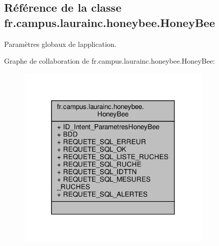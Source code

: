 \hypertarget{classfr_1_1campus_1_1laurainc_1_1honeybee_1_1_honey_bee}{}\subsection{Référence de la classe fr.\+campus.\+laurainc.\+honeybee.\+Honey\+Bee}
\label{classfr_1_1campus_1_1laurainc_1_1honeybee_1_1_honey_bee}


Paramètres globaux de l\textquotesingle{}application.  




Graphe de collaboration de fr.\+campus.\+laurainc.\+honeybee.\+Honey\+Bee\+:\nopagebreak
\begin{figure}[H]
\begin{center}
\leavevmode
\includegraphics[width=261pt]{classfr_1_1campus_1_1laurainc_1_1honeybee_1_1_honey_bee__coll__graph}
\end{center}
\end{figure}
